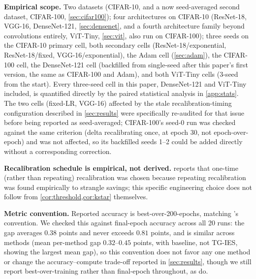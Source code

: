 \documentclass{article}
\theoremstyle{plain}
\theoremstyle{definition}
\theoremstyle{remark}
\begin{document}
\textbf{Empirical scope.} Two datasets (CIFAR-10, and a now seed-averaged second dataset, CIFAR-100, \cref{sec:cifar100}); four architectures on CIFAR-10 (ResNet-18, VGG-16, DenseNet-121, \cref{sec:densenet}, and a fourth architecture family beyond convolutions entirely, ViT-Tiny, \cref{sec:vit}, also run on CIFAR-100); three seeds on the CIFAR-10 primary cell, both secondary cells (ResNet-18/exponential, ResNet-18/fixed, VGG-16/exponential), the Adam cell (\cref{sec:adam}), the CIFAR-100 cell, the DenseNet-121 cell (backfilled from single-seed after this paper's first version, the same as CIFAR-100 and Adam), and both ViT-Tiny cells (3-seed from the start). Every three-seed cell in this paper, DenseNet-121 and ViT-Tiny included, is quantified directly by the paired statistical analysis in \cref{app:stats}. The two cells (fixed-LR, VGG-16) affected by the stale recalibration-timing configuration described in \cref{sec:results} were specifically re-audited for that issue before being reported as seed-averaged; CIFAR-100's seed-0 run was checked against the same criterion (delta recalibrating once, at epoch 30, not epoch-over-epoch) and was not affected, so its backfilled seeds 1--2 could be added directly without a corresponding correction.

\textbf{Recalibration schedule is empirical, not derived.}  reports that one-time (rather than repeating) recalibration was chosen because repeating recalibration was found empirically to strangle savings; this specific engineering choice does not follow from \cref{cor:threshold,cor:kstar} themselves.

\textbf{Metric convention.} Reported accuracy is best-over-200-epochs, matching \citet{yuan2025instance}'s convention. We checked this against final-epoch accuracy across all 20 runs: the gap averages $0.38$ points and never exceeds $0.81$ points, and is similar across methods (mean per-method gap $0.32$--$0.45$ points, with baseline, not TG-IES, showing the largest mean gap), so this convention does not favor any one method or change the accuracy--compute trade-off reported in \cref{sec:results}, though we still report best-over-training rather than final-epoch throughout, as \citet{yuan2025instance} do.
\end{document}
